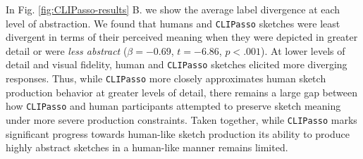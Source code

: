 \documentclass{article}
\begin{document}
In Fig. \ref{fig:CLIPasso-results} B. we show the average label divergence at each level of abstraction.
We found that humans and \texttt{CLIPasso} sketches were least divergent in terms of their perceived meaning when they were depicted in greater detail or were \textit{less abstract} ($\beta = -0.69$, $t=-6.86$, $p<.001$).
At lower levels of detail and visual fidelity, human and \texttt{CLIPasso} sketches elicited more diverging responses.
Thus, while \texttt{CLIPasso} more closely approximates human sketch production behavior at greater levels of detail, there remains a large gap between how \texttt{CLIPasso} and human participants attempted to preserve sketch meaning under more severe production constraints. 
Taken together, while \texttt{CLIPasso} marks significant progress towards human-like sketch production its ability to produce highly abstract sketches in a human-like manner remains limited.


\end{document}

